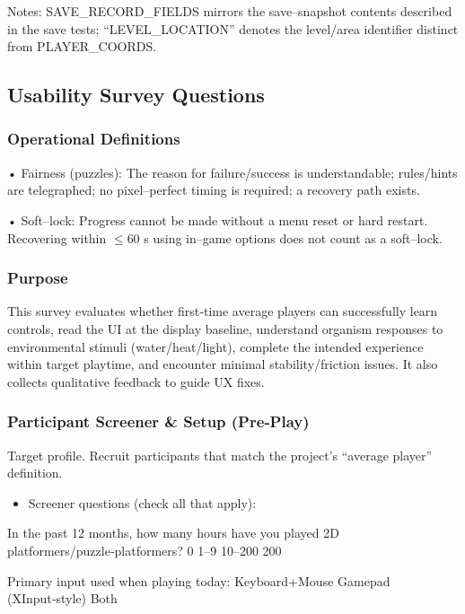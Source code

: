 \documentclass[12pt, titlepage]{article}
\begin{document}
Notes: SAVE\_RECORD\_FIELDS mirrors the save--snapshot contents described in the save tests; “LEVEL\_LOCATION” denotes the level/area identifier distinct from PLAYER\_COORDS.

\subsection{Usability Survey Questions}

\subsubsection{Operational Definitions}

• Fairness (puzzles): The reason for failure/success is understandable; rules/hints are telegraphed; no pixel--perfect timing is required; a recovery path exists.

• Soft--lock: Progress cannot be made without a menu reset or hard restart. Recovering within $\leq$60 s using in--game options does not count as a soft--lock.

\subsubsection{Purpose}

This survey evaluates whether first‑time average players can successfully learn controls, read the UI at the display baseline, understand organism responses to environmental stimuli (water/heat/light), complete the intended experience within target playtime, and encounter minimal stability/friction issues. It also collects qualitative feedback to guide UX fixes.

\subsubsection{Participant Screener \& Setup (Pre‑Play)}

Target profile. Recruit participants that match the project’s “average player” definition.

\begin{itemize}
  \item Screener questions (check all that apply):
\end{itemize}

In the past 12 months, how many hours have you played 2D platformers/puzzle‑platformers?
  0  1–9  10–200  200

Primary input used when playing today:  Keyboard+Mouse  Gamepad (XInput‑style)  Both
\end{document}
